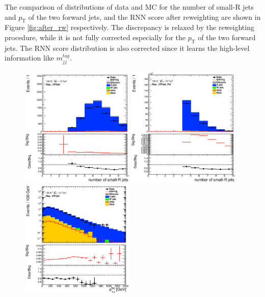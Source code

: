 The comparison of distributions of data and MC for the number of small-R jets and $p_\mathrm{T}$ of the two forward jets, and the RNN score after reweighting are shown in Figure \ref{fig:after_rw}
respectively. The discrepancy is relaxed by the reweighting procedure, while it is not fully corrected especially for the $p_\mathrm{T}$ of the two forward jets.
The RNN score distribution is also corrected since it learns the high-level information like $m^{tag}_{jj}$.
\begin{figure}[ht]
    \centering
    \includegraphics[width=0.48\textwidth]{figures/2lep/reweighting/after_reweighting/C_0ptag1pfat0pjet_0ptv_CRVjet_NJets_Lin.eps}
    \includegraphics[width=0.48\textwidth]{figures/2lep/reweighting/after_reweighting/C_0ptag2pjet_0ptv_CRVjet_Fid_NJets_Lin.eps}
    \includegraphics[width=0.48\textwidth]{figures/2lep/reweighting/after_reweighting/C_0ptag1pfat0pjet_0ptv_CRVjet_PtTagMerJets_Log.eps}

\end{figure}

